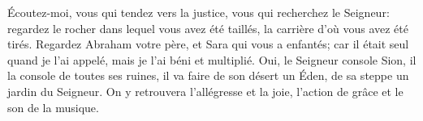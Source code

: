 Écoutez-moi, vous qui tendez vers la justice, vous qui recherchez le Seigneur:
	regardez le rocher dans lequel vous avez été taillés,
	la carrière d’où vous avez été tirés.
Regardez Abraham votre père, et Sara qui vous a enfantés;
	car il était seul quand je l’ai appelé, mais je l’ai béni et multiplié.
Oui, le Seigneur console Sion, il la console de toutes ses ruines,
	il va faire de son désert un Éden, de sa steppe un jardin du Seigneur.
On y retrouvera l’allégresse et la joie,
	l’action de grâce et le son de la musique.
